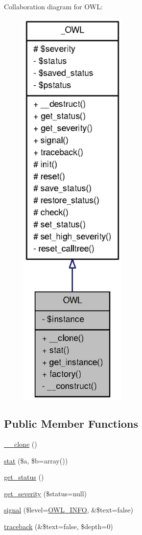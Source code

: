 Collaboration diagram for OWL:\nopagebreak
\begin{figure}[H]
\begin{center}
\leavevmode
\includegraphics[width=150pt]{classOWL__coll__graph}
\end{center}
\end{figure}
\subsection*{Public Member Functions}
\begin{DoxyCompactItemize}
\item 
\hyperlink{classOWL_a4ab99b467f8f388773f14dd37437bd11}{\_\-\_\-clone} ()
\item 
\hyperlink{classOWL_a6537b942a6cab370c296ff5befd8f382}{stat} (\$a, \$b=array())
\item 
\hyperlink{class__OWL_a99ec771fa2c5c279f80152cc09e489a8}{get\_\-status} ()
\item 
\hyperlink{class__OWL_adf9509ef96858be7bdd9414c5ef129aa}{get\_\-severity} (\$status=null)
\item 
\hyperlink{class__OWL_a51ba4a16409acf2a2f61f286939091a5}{signal} (\$level=\hyperlink{owl_8severitycodes_8php_a139328861128689f2f4def6a399d9057}{OWL\_\-INFO}, \&\$text=false)
\item 
\hyperlink{class__OWL_aa29547995d6741b7d2b90c1d4ea99a13}{traceback} (\&\$text=false, \$depth=0)
\end{DoxyCompactItemize}
